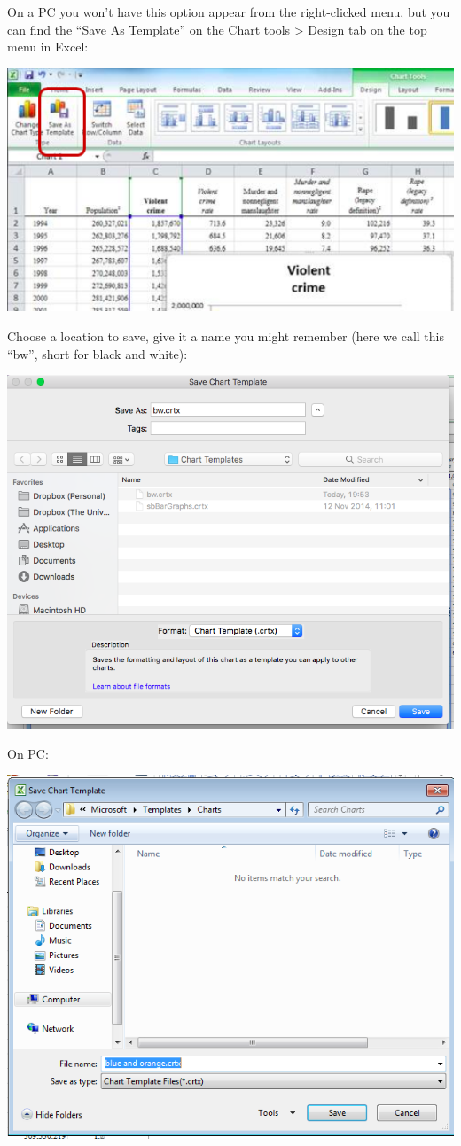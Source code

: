 \documentclass[
]{book}
\begin{document}
On a PC you won't have this option appear from the right-clicked menu, but you can find the ``Save As Template'' on the Chart tools \textgreater{} Design tab on the top menu in Excel:

\includegraphics{imgs/pc_save_template.png}

Choose a location to save, give it a name you might remember (here we call this ``bw'', short for black and white):

\includegraphics{imgs/name_template.png}

On PC:

\includegraphics{imgs/pc_save_template_3.png}
\end{document}
